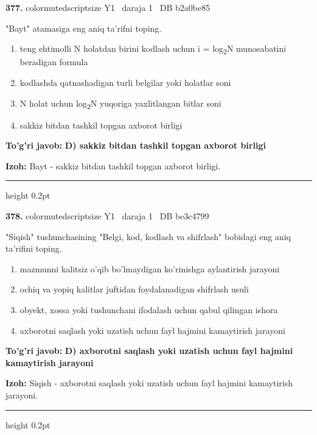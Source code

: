 \documentclass[10pt,a4paper,oneside]{article}
\begin{document}
\noindent\textbf{\color{ink}377.}  {color{muted}scriptsize Y1 \textbullet\ daraja 1 \textbullet\ DB b2a0be85}
\par
"Bayt" atamasiga eng aniq ta'rifni toping.
\begin{enumerate}[label=\Alph*),leftmargin=9mm]
\item teng ehtimolli N holatdan birini kodlash uchun i = log\textsubscript{2}N munosabatini beradigan formula
\item kodlashda qatnashadigan turli belgilar yoki holatlar soni
\item N holat uchun log\textsubscript{2}N yuqoriga yaxlitlangan bitlar soni
\item sakkiz bitdan tashkil topgan axborot birligi
\end{enumerate}
\begin{tcolorbox}[enhanced,breakable,colback=teal!4,colframe=teal!50!black,boxrule=0.5pt,arc=1.1mm,left=3mm,right=3mm,top=1.7mm,bottom=1.7mm,before skip=2mm,after skip=2mm]
\textbf{\color{teal}To'g'ri javob:} \textbf{D) sakkiz bitdan tashkil topgan axborot birligi}
\par\smallskip
\textbf{Izoh:} Bayt - sakkiz bitdan tashkil topgan axborot birligi.
\end{tcolorbox}
\vspace{2mm}\hrule height 0.2pt \vspace{3mm}

\noindent\textbf{\color{ink}378.}  {color{muted}scriptsize Y1 \textbullet\ daraja 1 \textbullet\ DB be3c4799}
\par
"Siqish" tushunchasining "Belgi, kod, kodlash va shifrlash" bobidagi eng aniq ta'rifini toping.
\begin{enumerate}[label=\Alph*),leftmargin=9mm]
\item mazmunni kalitsiz o'qib bo'lmaydigan ko'rinishga aylantirish jarayoni
\item ochiq va yopiq kalitlar juftidan foydalanadigan shifrlash usuli
\item obyekt, xossa yoki tushunchani ifodalash uchun qabul qilingan ishora
\item axborotni saqlash yoki uzatish uchun fayl hajmini kamaytirish jarayoni
\end{enumerate}
\begin{tcolorbox}[enhanced,breakable,colback=teal!4,colframe=teal!50!black,boxrule=0.5pt,arc=1.1mm,left=3mm,right=3mm,top=1.7mm,bottom=1.7mm,before skip=2mm,after skip=2mm]
\textbf{\color{teal}To'g'ri javob:} \textbf{D) axborotni saqlash yoki uzatish uchun fayl hajmini kamaytirish jarayoni}
\par\smallskip
\textbf{Izoh:} Siqish - axborotni saqlash yoki uzatish uchun fayl hajmini kamaytirish jarayoni.
\end{tcolorbox}
\vspace{2mm}\hrule height 0.2pt \vspace{3mm}
\end{document}
